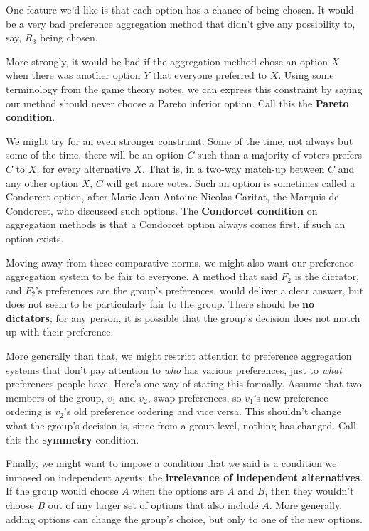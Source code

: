 \documentclass[openany]{book}
\begin{document}
One feature we'd like is that each option has a chance of being chosen. It would be a very bad preference aggregation method that didn't give any possibility to, say, $R_3$ being chosen.

More strongly, it would be bad if the aggregation method chose an option $X$ when there was another option $Y$ that everyone preferred to $X$. Using some terminology from the game theory notes, we can express this constraint by saying our method should never choose a Pareto inferior option. Call this the \textbf{Pareto condition}.

We might try for an even stronger constraint. Some of the time, not always but some of the time, there will be an option $C$ such than a majority of voters prefers $C$ to $X$, for every alternative $X$. That is, in a two-way match-up between $C$ and any other option $X$, $C$ will get more votes. Such an option is sometimes called a Condorcet option, after Marie Jean Antoine Nicolas Caritat, the Marquis de Condorcet, who discussed such options. The \textbf{Condorcet condition} on aggregation methods is that a Condorcet option always comes first, if such an option exists.

Moving away from these comparative norms, we might also want our preference aggregation system to be fair to everyone. A method that said $F_2$ is the dictator, and $F_2$'s preferences are the group's preferences, would deliver a clear answer, but does not seem to be particularly fair to the group. There should be \textbf{no dictators}; for any person, it is possible that the group's decision does not match up with their preference.

More generally than that, we might restrict attention to preference aggregation systems that don't pay attention to \textit{who} has various preferences, just to \textit{what} preferences people have. Here's one way of stating this formally. Assume that two members of the group, $v_1$ and $v_2$, swap preferences, so $v_1$'s new preference ordering is $v_2$'s old preference ordering and vice versa. This shouldn't change what the group's decision is, since from a group level, nothing has changed. Call this the \textbf{symmetry} condition.

Finally, we might want to impose a condition that we said is a condition we imposed on independent agents: the \textbf{irrelevance of independent alternatives}. If the group would choose $A$ when the options are $A$ and $B$, then they wouldn't choose $B$ out of any larger set of options that also include $A$. More generally, adding options can change the group's choice, but only to one of the new options.
\end{document}
